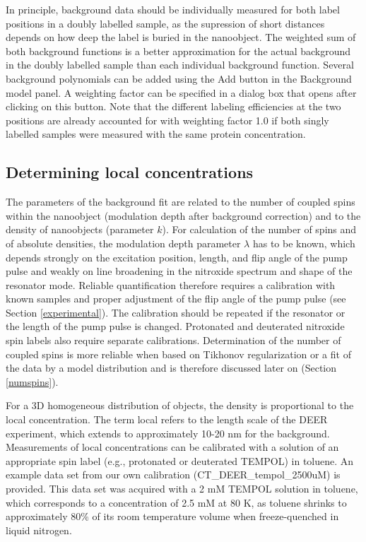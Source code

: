 \documentclass{article}
\begin{document}
In principle, background data should be individually measured for both label positions in a doubly labelled sample, as the supression of short distances depends on how deep the label is buried in the nanoobject. The weighted sum of both background functions is a better approximation for the actual background in the doubly labelled sample than each individual background function. Several background polynomials can be added using the {\ttfamily Add} button in the {\ttfamily Background model} panel. A weighting factor can be specified in a dialog box that opens after clicking on this button. Note that the different labeling efficiencies at the two positions are already accounted for with weighting factor 1.0 if both singly labelled samples were measured with the same protein concentration. 

\subsection{Determining local concentrations}
\label{localconc}
The parameters of the background fit are related to the number of coupled spins
within the nanoobject (modulation depth after background correction) and to the density of nanoobjects (parameter $k$). For calculation of the number of spins and of absolute densities, the modulation depth parameter $\lambda$ has to be known, which depends strongly on the
excitation position, length, and flip angle of the pump pulse and weakly on line broadening in the nitroxide spectrum and shape of the resonator mode. Reliable
quantification therefore requires a calibration with known samples and proper
adjustment of the flip angle of the pump pulse (see Section \ref{experimental}). The calibration should
be repeated if the resonator or the length of the pump pulse is changed. Protonated
and deuterated nitroxide spin labels also require separate calibrations.
Determination of the number of coupled spins is more reliable when based on
Tikhonov regularization or a fit of the data by a model distribution and is therefore discussed later on (Section \ref{numspins}).

For a 3D homogeneous distribution of objects, the density is proportional to
the local concentration. The term local refers to the length scale of the DEER
experiment, which extends to approximately 10-20 nm for the background.
Measurements of local concentrations can be calibrated with a solution of an
appropriate spin label (e.g., protonated or deuterated TEMPOL) in toluene.
An example data set from our own calibration (CT\_DEER\_tempol\_2500uM) is
provided. This data set was acquired with a 2 mM TEMPOL solution in toluene,
which corresponds to a concentration of 2.5 mM at 80 K, as toluene shrinks to
approximately 80\% of its room temperature volume when freeze-quenched in
liquid nitrogen.
\end{document}
